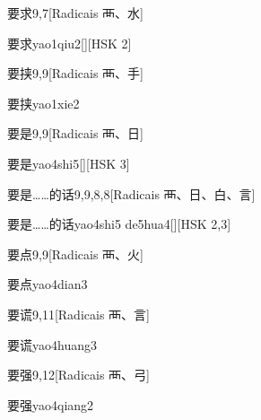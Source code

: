 \begin{entry}{要求}{9,7}[Radicais ⾑、⽔]
  \begin{phonetics}{要求}{yao1qiu2}[][HSK 2]
  \end{phonetics}
\end{entry}

\begin{entry}{要挟}{9,9}[Radicais ⾑、⼿]
  \begin{phonetics}{要挟}{yao1xie2}
  \end{phonetics}
\end{entry}

\begin{entry}{要是}{9,9}[Radicais ⾑、⽇]
  \begin{phonetics}{要是}{yao4shi5}[][HSK 3]
  \end{phonetics}
\end{entry}

\begin{entry}{要是……的话}{9,9,8,8}[Radicais ⾑、⽇、⽩、⾔]
  \begin{phonetics}{要是……的话}{yao4shi5 de5hua4}[][HSK 2,3]
  \end{phonetics}
\end{entry}

\begin{entry}{要点}{9,9}[Radicais ⾑、⽕]
  \begin{phonetics}{要点}{yao4dian3}
  \end{phonetics}
\end{entry}

\begin{entry}{要谎}{9,11}[Radicais ⾑、⾔]
  \begin{phonetics}{要谎}{yao4huang3}
  \end{phonetics}
\end{entry}

\begin{entry}{要强}{9,12}[Radicais ⾑、⼸]
  \begin{phonetics}{要强}{yao4qiang2}
  \end{phonetics}
\end{entry}

